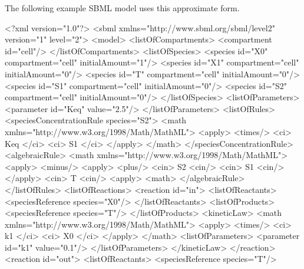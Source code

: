 \documentclass[10pt,twocolumntoc]{cekarticle}
\begin{document}
The following example SBML model uses this approximate form.

\begin{example}
<?xml version="1.0"?>
<sbml xmlns="http://www.sbml.org/sbml/level2" version="1" level="2">
    <model>
        <listOfCompartments>
            <compartment id="cell"/>
        </listOfCompartments>
        <listOfSpecies>
            <species id="X0" compartment="cell" initialAmount="1"/>
            <species id="X1" compartment="cell" initialAmount="0"/>
            <species id="T" compartment="cell" initialAmount="0"/>
            <species id="S1" compartment="cell" initialAmount="0"/>
            <species id="S2" compartment="cell" initialAmount="0"/>
        </listOfSpecies>
        <listOfParameters>
            <parameter id="Keq" value="2.5"/>
        </listOfParameters>
        <listOfRules>
            <speciesConcentrationRule species="S2">
                <math xmlns="http://www.w3.org/1998/Math/MathML">
                    <apply>
                        <times/>
                        <ci> Keq </ci>
                        <ci> S1 </ci>
                    </apply>
                </math>
            </speciesConcentrationRule>
            <algebraicRule>
                <math xmlns="http://www.w3.org/1998/Math/MathML">
                    <apply>
                        <minus/>
                        <apply>
                            <plus/>
                            <cin> S2 <cin/>
                            <cin> S1 <cin/>
                        </apply>
                        <cin> T <cin/>
                    <apply>
                <math>
            </algebraicRule>
        </listOfRules>
        <listOfReactions>
            <reaction id="in">
                <listOfReactants>
                    <speciesReference species="X0"/>
                </listOfReactants>
                <listOfProducts>
                    <speciesReference species="T"/>
                </listOfProducts>
                <kineticLaw>
                    <math xmlns="http://www.w3.org/1998/Math/MathML">
                        <apply>
                            <times/>
                            <ci> k1 </ci>
                            <ci> X0 </ci>
                        </apply>
                    </math>
                    <listOfParameters>
                        <parameter id="k1" value="0.1"/>
                    </listOfParameters>
                </kineticLaw>
            </reaction>
            <reaction id="out">
                <listOfReactants>
                    <speciesReference species="T"/>

\end{example}
\end{document}
